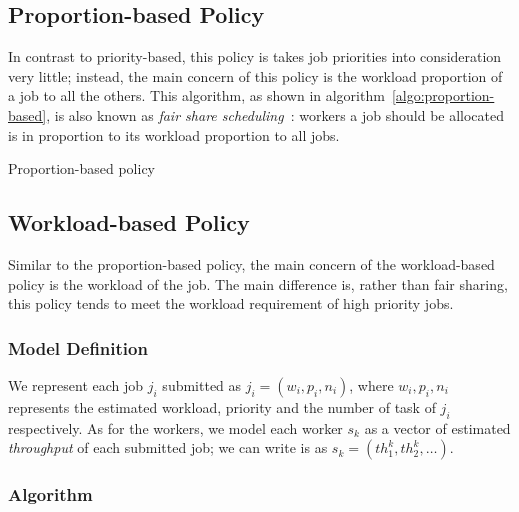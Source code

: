 \subsection{Proportion-based Policy}

In contrast to priority-based, this policy is takes job priorities into
consideration very little; instead, the main concern of this policy is
the workload proportion of a job to all the others.
This algorithm, as shown in algorithm~\ref{algo:proportion-based}, is
also known as \emph{fair share
scheduling}~\cite{cite:fair-share-scheduling}: workers a job should be
allocated is in proportion to its workload proportion to all jobs. 


\begin{algorithm}[H]
  
  \caption{Proportion-based policy}
  \label{algo:proportion-based}
\end{algorithm}

\subsection{Workload-based Policy}

Similar to the proportion-based policy, the main concern of the
workload-based policy is the workload of the job.
The main difference is, rather than fair sharing, this policy tends to
meet the workload requirement of high priority jobs.

\subsubsection{Model Definition}

We represent each job $j_i$ submitted as $j_i = (w_i, p_i, n_i)$, where
$w_i, p_i, n_i$ represents the estimated workload, priority and the
number of task of $j_i$ respectively.
As for the workers, we model each worker $s_k$ as a vector of estimated
\emph{throughput} of each submitted job; we can write is as $s_k =
(th^k_1, th^k_2, \ldots)$.


\subsubsection{Algorithm}

